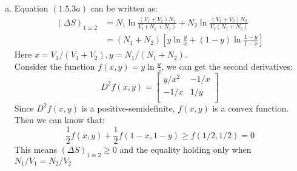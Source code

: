 \documentclass{article}
\begin{document}
    \begin{enumerate}[(a)]
        \item   Equation $(1.5.3a)$ can be written as: 
                \begin{equation}
                \begin{aligned}
                    \left(\Delta S \right)_{1\equiv 2}&=N_1\ln \frac{(V_1+V_2)N_1}{V_1(N_1+N_2)}+N_2\ln \frac{(V_1+V_2)N_2}{V_2(N_1+N_2)}\\
                                                    &=(N_1+N_2)\left[y\ln \frac{y}{x}+(1-y)\ln\frac{1-y}{1-x}\right]
                \end{aligned}
                \end{equation}
                Here $x=V_1/(V_1+V_2), y=N_1/(N_1+N_2)$.\\
                
                Consider the function $f(x,y)=y \ln \frac{y}{x}$, we can get the second derivatives:
                \begin{equation}
                    D^2 f(x,y)=\left[
                    \begin{array}{cc}
                        y/x^2 & -1/x \\
                        -1/x & 1/y \\
                    \end{array}\right]
                \end{equation}
                Since $D^2 f(x,y)$ is a positive-semidefinite, $f(x,y)$ is a convex function. Then we can know that:
                \begin{equation}
                    \frac{1}{2} f(x,y)+\frac{1}{2}f(1-x,1-y)\geq f(1/2,1/2)=0
                \end{equation}
                This means $\left(\Delta S \right)_{1\equiv 2}\geq 0$ and the equality holding only when $N_1/V_1=N_2/V_2$
                

\end{enumerate}
\end{document}
